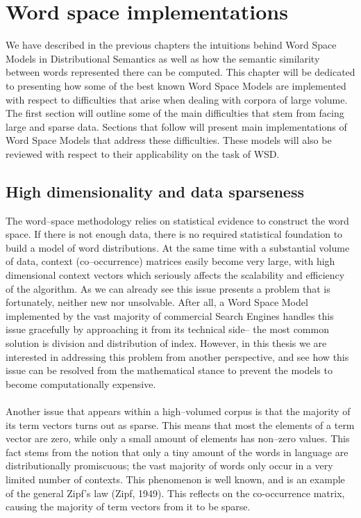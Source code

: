 \chapter{Word space implementations}
We have described in the previous chapters the intuitions behind Word Space Models in Distributional 
Semantics as well as how the semantic similarity between words represented there can be computed. 
This chapter will be dedicated to presenting how some of the best known Word Space Models are 
implemented with respect to difficulties that arise when dealing with corpora of large volume. The first 
section will outline some of the main difficulties that stem from facing large and sparse data. Sections 
that follow will present main implementations of Word Space Models that address these difficulties. 
These models will also be reviewed with respect to their applicability on the task of WSD. 

\section{High dimensionality and data sparseness}
The word--space methodology relies on statistical evidence to construct the word space. If there is not 
enough data, there is no   required statistical foundation to build a model of word distributions. At the 
same time with a substantial volume of data, context (co--occurrence) matrices easily become very 
large, with high dimensional context vectors which seriously affects the scalability and efficiency of the 
algorithm. As we can already see this issue presents a problem that is fortunately, neither new nor 
unsolvable. After all, a Word Space Model implemented by the vast majority of commercial Search 
Engines handles this issue gracefully by approaching it from its technical side-- the most common 
solution is division and distribution of index. However, in this thesis we are interested in addressing 
this problem from another perspective, and see how this issue can be resolved from the mathematical 
stance to prevent the models to become computationally expensive.
\\\\  Another issue that appears within a high--volumed corpus is that the majority of its term vectors 
turns out as sparse. This means that most the elements of a term vector are zero, while only a small 
amount of elements has non--zero values. This fact stems from the notion that only a tiny amount of the 
words in language are distributionally promiscuous; the vast majority of words only occur in a very 
limited number of contexts. This phenomenon is well known, and is an example of the general Zipf's 
law (Zipf, 1949). This reflects on the co-occurrence matrix, causing the majority of 
term vectors from it to be sparse. 

